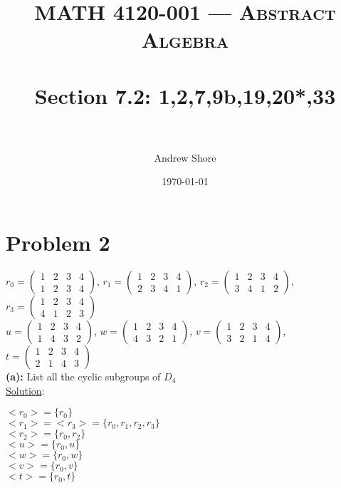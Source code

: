 \documentclass{article} %
\title{ 
\normalfont \normalsize 
\textsc{MATH 4120-001 --- Abstract Algebra} \\
\horrule{0.5pt} \\[0cm] %
\huge Section 7.2: 1,2,7,9b,19,20*,33 \\ %
\horrule{2pt} \\[0cm] %
}
\author{Andrew Shore} %
\date{\normalsize\today} %
\begin{document}
\maketitle %

\section*{Problem 2}

$r_0 = \left( \begin{matrix} 1&2&3&4\\1&2&3&4 \end{matrix} \right)$,
$r_1 = \left( \begin{matrix} 1&2&3&4\\2&3&4&1 \end{matrix} \right)$,
$r_2 = \left( \begin{matrix} 1&2&3&4\\3&4&1&2 \end{matrix} \right)$,
$r_3 = \left( \begin{matrix} 1&2&3&4\\4&1&2&3 \end{matrix} \right)$ \\
$u   = \left( \begin{matrix} 1&2&3&4\\1&4&3&2 \end{matrix} \right)$,
$w   = \left( \begin{matrix} 1&2&3&4\\4&3&2&1 \end{matrix} \right)$,
$v   = \left( \begin{matrix} 1&2&3&4\\3&2&1&4 \end{matrix} \right)$,
$t   = \left( \begin{matrix} 1&2&3&4\\2&1&4&3 \end{matrix} \right)$ \\
\textbf{(a): } List all the cyclic subgroups of $D_4$ 
\\
\underline{Solution}: 
\begin{addmargin}[1em]{0em}
$<r_0> = \{r_0\}$\\
$<r_1> = <r_3> = \{r_0, r_1, r_2, r_3\}$\\
$<r_2> = \{r_0, r_2\}$\\
$<u> = \{r_0, u\}$\\
$<w> = \{r_0, w\}$\\
$<v> = \{r_0, v\}$\\
$<t> = \{r_0, t\}$
\end{addmargin} 
\end{document}
